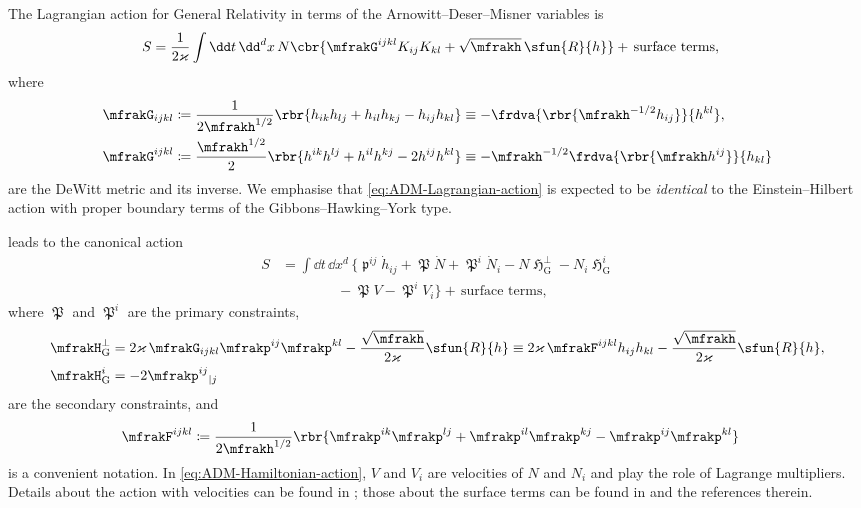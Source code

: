 \documentclass[a4paper,11pt]{article}
\begin{document}
The Lagrangian action for General Relativity in terms of the 
Arnowitt--Deser--Misner variables is \cite[ch.\ 4.2.2]{Kiefer2012}
\begin{align}
S &= \frac{1}{2\varkappa}\int\dd t\,\dd^d x\,N\cbr{\mfrakG^{ijkl}K_{ij}K_{kl}+
\sqrt{\mfrakh}\,\sfun{R}{h}}+\,\text{surface terms},
\label{eq:ADM-Lagrangian-action}
\end{align}
where
\begin{align}
\mfrakG_{ijkl} &\coloneqq \frac{1}{2\mfrakh^{1/2}}
\rbr{h_{ik}h_{lj}+h_{il}h_{kj}-h_{ij}h_{kl}}
\equiv -\frdva{\rbr{\mfrakh^{-1/2}h_{ij}}}{h^{kl}},\\
\mfrakG^{ijkl} &\coloneqq \frac{\mfrakh^{1/2}}{2}
\rbr{h^{ik}h^{lj}+h^{il}h^{kj}-2h^{ij}h^{kl}}
\equiv -\mfrakh^{-1/2}\frdva{\rbr{\mfrakh h^{ij}}}{h_{kl}}
\end{align}
are the DeWitt metric and its inverse. We emphasise that 
\cref{eq:ADM-Lagrangian-action} is expected to be \emph{identical} to the 
Einstein--Hilbert action with proper boundary terms of the 
Gibbons--Hawking--York type.

 leads to the canonical action
\begin{align}
S &=
\int\dd t\,\dd x^d\,\Big\{
\mfrakp^{ij}\dot{h}_{ij} + \mfrakP\dot{N} + \mfrakP^i \dot{N}_i
-N\mfrakH_\text{G}^\perp - N_i\mfrakH_\text{G}^i
\nonumber \\
&\qquad\qquad
- \mfrakP V - \mfrakP^i V_i\Big\} +\,\text{surface terms},
\label{eq:ADM-Hamiltonian-action}
\end{align}
where $\mfrakP$ and $\mfrakP^i$ are the primary constraints,
\begin{align}
\mfrakH_\text{G}^\perp &=
2 \varkappa\,\mfrakG_{ijkl} \mfrakp^{ij}\mfrakp^{kl}
- \frac{\sqrt{\mfrakh}}{2\varkappa} \sfun{R}{h}
\equiv
2 \varkappa\,\mfrakF^{ijkl} h_{ij}h_{kl}
- \frac{\sqrt{\mfrakh}}{2\varkappa} \sfun{R}{h},
\\
\mfrakH_\text{G}^i &=
-2 \mfrakp^{ij}{}_{|j}
\end{align}
are the secondary constraints, and
\begin{align}
\mfrakF^{ijkl} &\coloneqq \frac{1}{2\mfrakh^{1/2}}
\rbr{\mfrakp^{ik}\mfrakp^{lj}+\mfrakp^{il}\mfrakp^{kj}
-\mfrakp^{ij}\mfrakp^{kl}}
\end{align}
is a convenient notation. In \cref{eq:ADM-Hamiltonian-action}, $V$ and $V_i$ 
are velocities of $N$ and $N_i$ and play the role of Lagrange 
multipliers. Details about the action with velocities can be found in 
\cite{Gitman1990}; those about the surface terms can be found in \cite[ch.\ 
4.2]{Poisson2004} and the references therein.
\end{document}
